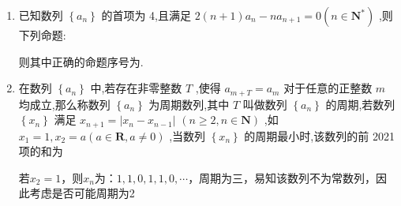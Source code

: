 \begin{enumerate}
\begin{jieda}
        当$q = -1$时存在${S}_{n} = {S}_{n + 2}$，故错误

        $q = 1$时易知不可能有$S_n = S_{n+3}$，当$q \neq 1$时，$q^3 = 1$无实数解，因此不可能有$S_n = S_{n+3}$，因此正确
    \end{jieda}
    \item 已知数列 $\left\{  {a}_{n}\right\}$ 的首项为 4,且满足 $2\left( {n + 1}\right) {a}_{n} - n{a}_{n + 1} = 0\left( {n \in  {\mathbf{N}}^{ * }}\right)$ ,则下列命题: 
    则其中正确的命题序号为.
    \begin{jieda}
    \end{jieda}
    \item 在数列 $\left\{  {a}_{n}\right\}$ 中,若存在非零整数 $T$ ,使得 ${a}_{m + T} = {a}_{m}$ 对于任意的正整数 $m$ 均成立,那么称数列 $\left\{  {a}_{n}\right\}$ 为周期数列,其中 $T$ 叫做数列 $\left\{  {a}_{n}\right\}$ 的周期,若数列 $\left\{  {x}_{n}\right\}$ 满足 ${x}_{n + 1} = \left| {{x}_{n} - {x}_{n - 1}}\right|$  $\left( {n \geq  2,n \in  \mathbf{N}}\right)$ ,如 ${x}_{1} = 1,{x}_{2} = a\left( {a \in  \mathbf{R},a \neq  0}\right)$ ,当数列 $\left\{  {x}_{n}\right\}$ 的周期最小时,该数列的前 2021 项的和为
    \begin{jieda}
        若$x_2 = 1$，则$x_n$为：$1,1,0,1,1,0,\cdots $，周期为三，易知该数列不为常数列，因此考虑是否可能周期为2


\end{jieda}
\end{enumerate}

